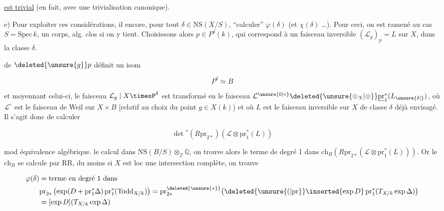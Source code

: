 \uline{est trivial} (en fait, avec une trivialisation canonique).

e) Pour exploiter ces considérations, il  encore, pour tout $\delta\in\mathrm{NS}(X/S)$, ``calculer'' $\varphi(\delta)$ (et $\chi(\delta)$ \ldots). Pour ceci, on  est ramené au cas $S=\mathrm{Spec}\,k$,  un corps, alg. clos si on y tient\deleted{\unsure{)}}. Choisissons alors $p\in P^\delta(k)$, qui correspond à un faisceau inversible $(\mathcal L_g)_p=L$ sur $X$, dans la classe $\delta$.


 de $\deleted{\unsure{g}}p$ définit un isom

\[
P^\delta\simeq B
\]

et moyennant celui-ci, le faisceau $\mathcal L_g\mid X\timesP^\delta$  est transformé en  le faisceau $\mathcal L^{\unsure{0|\circ}}\deleted{\unsure{\otimes_X|\otimes}}\underline{\mathrm{pr}}_1^*(L_{\unsure{\delta|{}}})$, où $\mathcal L^\circ$ est le faisceau de Weil sur $X\times B$ [relatif au choix du point $g\in X(k)$) et où $L$ est le faisceau inversible sur $X$  de classe $\delta$ déjà envisagé. Il s'agit donc de calculer

\[
\det{}^{*}(R\mathrm{pr}_{2*})(\mathcal L\otimes\mathrm{pr}_1^*(L))
\]

 mod équivalence algébrique.     le calcul dans $\mathrm{NS}(B/S)\otimes_{\mathbb Z}\mathbb Q$,  on trouve alors le terme de degré 1 dans $\mathrm{ch}_B(R\mathrm{pr}_{2*}(\mathcal L\otimes\mathrm{pr}_1^*(L)))$. Or le $\mathrm{ch}_B$ se calcule par RR, du moins si $X$ est loc une intersection complète, on trouve

\[
\begin{aligned}
\varphi(\delta)&=\text{terme en degré 1 dans}\\
&\mathrm{pr}_{2*}\left(\exp(D+\mathrm{pr}_1^*\Delta)\,\mathrm{pr}_1^*(\mathrm{Todd}_{X/k})\right)
=\mathrm{pr}_{2*}^{\deleted{\unsure{*}}}\bigl(\deleted{\unsure{(|\mathrm{pr}}}\inserted{\exp D}\,\mathrm{pr}_1^*(T_{X/k}\exp\Delta)\bigr)\\
&=[\exp D](T_{X/k}\exp\Delta)
\end{aligned}
\]

